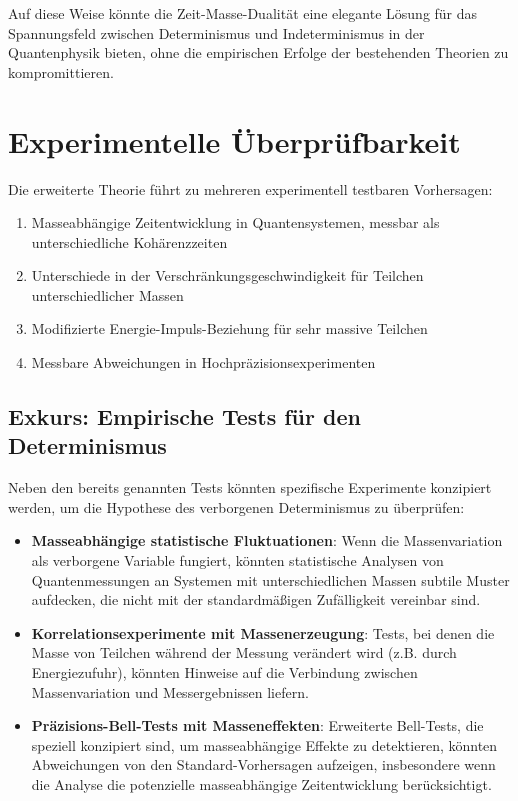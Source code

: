 \documentclass[12pt,a4paper]{article}  %
\begin{document}
		Auf diese Weise könnte die Zeit-Masse-Dualität eine elegante Lösung für das Spannungsfeld zwischen Determinismus und Indeterminismus in der Quantenphysik bieten, ohne die empirischen Erfolge der bestehenden Theorien zu kompromittieren.
		
		\section{Experimentelle Überprüfbarkeit}
		
		Die erweiterte Theorie führt zu mehreren experimentell testbaren Vorhersagen:
		
		\begin{enumerate}
		\item Masseabhängige Zeitentwicklung in Quantensystemen, messbar als unterschiedliche Kohärenzzeiten
		\item Unterschiede in der Verschränkungsgeschwindigkeit für Teilchen unterschiedlicher Massen
		\item Modifizierte Energie-Impuls-Beziehung für sehr massive Teilchen
		\item Messbare Abweichungen in Hochpräzisionsexperimenten
		\end{enumerate}
		
		\subsection{Exkurs: Empirische Tests für den Determinismus}
		
		Neben den bereits genannten Tests könnten spezifische Experimente konzipiert werden, um die Hypothese des verborgenen Determinismus zu überprüfen:
		
		\begin{itemize}
		\item \textbf{Masseabhängige statistische Fluktuationen}: Wenn die Massenvariation als verborgene Variable fungiert, könnten statistische Analysen von Quantenmessungen an Systemen mit unterschiedlichen Massen subtile Muster aufdecken, die nicht mit der standardmäßigen Zufälligkeit vereinbar sind.
		
		\item \textbf{Korrelationsexperimente mit Massenerzeugung}: Tests, bei denen die Masse von Teilchen während der Messung verändert wird (z.B. durch Energiezufuhr), könnten Hinweise auf die Verbindung zwischen Massenvariation und Messergebnissen liefern.
		
		\item \textbf{Präzisions-Bell-Tests mit Masseneffekten}: Erweiterte Bell-Tests, die speziell konzipiert sind, um masseabhängige Effekte zu detektieren, könnten Abweichungen von den Standard-Vorhersagen aufzeigen, insbesondere wenn die Analyse die potenzielle masseabhängige Zeitentwicklung berücksichtigt.
		\end{itemize}
		
\end{document}
